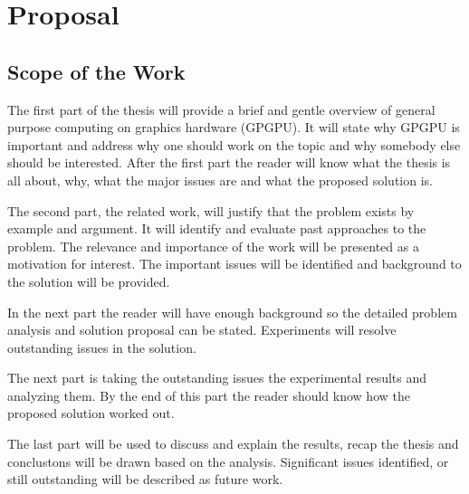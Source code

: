\chapter{Proposal}
\label{ch:proposal}

\section*{Scope of the Work} %
\label{sec:scope_of_the_work}

The first part of the thesis will provide a brief and gentle overview of general
purpose computing on graphics hardware (GPGPU). It will state why GPGPU is
important and address why one should work on the topic and why somebody else
should be interested. After the first part the reader will know what the thesis
is all about, why, what the major issues are and what the proposed solution is.

The second part, the related work, will justify that the problem exists by
example and argument. It will identify and evaluate past approaches to the
problem. The relevance and importance of the work will be presented as a
motivation for interest. The important issues will be identified and background
to the solution will be provided.

In the next part the reader will have enough background so the detailed problem
analysis and solution proposal can be stated. Experiments will resolve
outstanding issues in the solution.

The next part is taking the outstanding issues the experimental results and
analyzing them. By the end of this part the reader should know how the proposed
solution worked out.

The last part will be used to discuss and explain the results, recap the thesis
and conclustons will be drawn based on the analysis. Significant issues
identified, or still outstanding will be described as future work.



